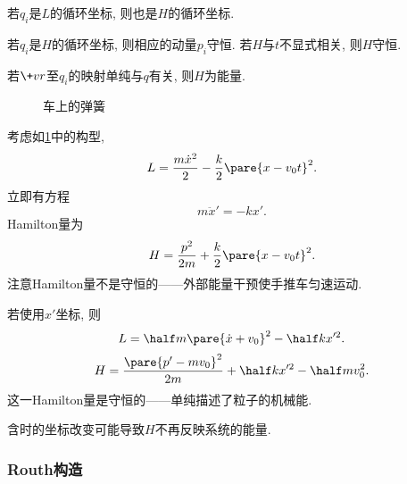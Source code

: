 \documentclass[../TheoreticalMechanics.tex]{subfiles}
\begin{document}
\begin{lemma}[Hamilton量的循环坐标]
    若$q_i$是$L$的循环坐标, 则也是$H$的循环坐标.
\end{lemma}
\begin{finale}
    \begin{theorem}[循环坐标动量守恒]
        若$q_i$是$H$的循环坐标, 则相应的动量$p_i$守恒. 若$H$与$t$不显式相关, 则$H$守恒.
    \end{theorem}
\end{finale}
\begin{theorem}[Hamilton量作为能量]
    若$\+vr$至$q_i$的映射单纯与$q$有关, 则$H$为能量.
\end{theorem}
\begin{figure}[ht]
    \centering
    \caption{车上的弹簧}
    \label{fig:车上的弹簧}
\end{figure}
\begin{ex}
    考虑如\cref{fig:车上的弹簧}中的构型,
    \[ L = \frac{m\dot{x}^2}{2} - \frac{k}{2}\pare{x - v_0t}^2. \]
    立即有方程
    \[ m\ddot{x}' = -kx'. \]
    Hamilton量为
    \[ H = \frac{p^2}{2m} + \frac{k}{2}\pare{x-v_0t}^2. \]
    注意Hamilton量不是守恒的——外部能量干预使手推车匀速运动.
    \par
    若使用$x'$坐标, 则
    \[ L = \half m\pare{\dot{x} + v_0}^2 - \half kx'^2. \]
    \[ H = \frac{\pare{p' - mv_0}^2}{2m} + \half kx'^2 - \half mv_0^2. \]
    这一Hamilton量是守恒的——单纯描述了粒子的机械能.
\end{ex}
\begin{pitfall}
    含时的坐标改变可能导致$H$不再反映系统的能量.
\end{pitfall}


\subsubsection{Routh构造} %
\label{ssub:routh构造}
\end{document}
